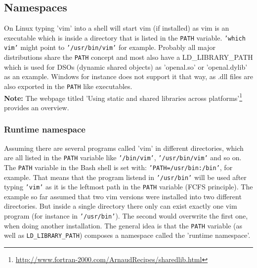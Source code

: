 \documentclass[a4paper,10pt]{article}
\begin{document}
\addtocounter{footnote}{-3}
\addtocounter{footnote}{1}
\addtocounter{footnote}{1}
\addtocounter{footnote}{1}








\subsection{Namespaces}
On Linux typing 'vim' into a shell will start vim (if installed) as vim is an executable which is inside a directory that is listed in the \texttt{PATH} variable. \texttt{'which vim'} might point to \texttt{'/usr/bin/vim'} for example. Probably all major distributions share the \texttt{PATH} concept and most also have a LD\_LIBRARY\_PATH which is used for DSOs (dynamic shared objects) as 'openal.so' or 'openal.dylib' as an example. Windows for instance does not support it that way, as .dll files are also exported in the \texttt{PATH} like executables.\\

\textbf{Note:} The webpage titled 'Using static and shared libraries across platforms'\footnote{\url{http://www.fortran-2000.com/ArnaudRecipes/sharedlib.html}} provides an overview.

\subsubsection{Runtime namespace}
Assuming there are several programs called 'vim' in different directories, which are all listed in the \texttt{PATH} variable like \texttt{'/bin/vim'}, \texttt{'/usr/bin/vim'} and so on. The \texttt{PATH} variable in the Bash shell is set with: \texttt{'PATH=/usr/bin:/bin'}, for example. That means that the program listend in \texttt{'/usr/bin'} will be used after typing \texttt{'vim'} as it is the leftmost path in the \texttt{PATH} variable (FCFS principle). The example so far assumed that two vim versions were installed into two different directories. But inside a single directory there only can exist exactly one vim program (for instance in \texttt{'/usr/bin'}). The second would overwrite the first one, when doing another installation. The general idea is that the \texttt{PATH} variable (as well as \texttt{LD\_LIBRARY\_PATH}) composes a namespace called the 'runtime namespace'.
\end{document}
